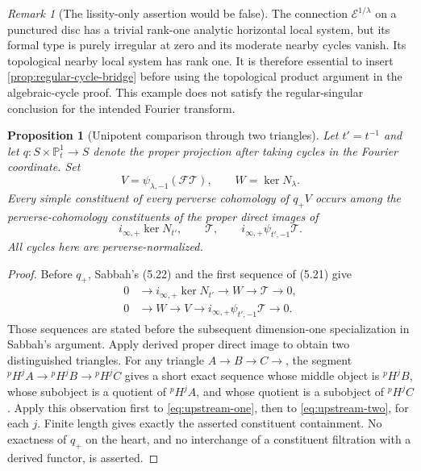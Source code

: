\documentclass[11pt]{article}
\numberwithin{equation}{section}
\newtheorem{proposition}[proposition]{Proposition}
\theoremstyle{definition}
\theoremstyle{remark}
\newtheorem{remark}[remark]{Remark}
\newcommand{\Ecal}{\mathcal E}
\newcommand{\pH}{{}^{p}\!H}
\begin{document}
\begin{remark}[The lissity-only assertion would be false]
The connection $\Ecal^{1/\lambda}$ on a punctured disc has a trivial
rank-one analytic horizontal local system, but its formal type is purely
irregular at zero and its moderate nearby cycles vanish. Its topological
nearby local system has rank one. It is therefore essential to insert
\cref{prop:regular-cycle-bridge} before using the topological product
argument in the algebraic-cycle proof. This example does not satisfy the
regular-singular conclusion for the intended Fourier transform.
\end{remark}

\begin{proposition}[Unipotent comparison through two triangles]\label{prop:two-triangles}
Let $t'=t^{-1}$ and let $q:S\times\mathbb P^1_t\to S$ denote the
proper projection after taking cycles in the Fourier coordinate. Set
\[
 V=\psi_{\lambda,-1}(\mathcal F\mathcal T),\qquad W=\ker N_\lambda.
\]
Every simple constituent of every perverse cohomology of $q_+V$ occurs
among the perverse-cohomology constituents of the proper direct images of
\begin{equation}\label{eq:unipotent-geometric-sources}
 i_{\infty,+}\ker N_{t'},\qquad
 \mathcal T,\qquad
 i_{\infty,+}\psi_{t',-1}\mathcal T.
\end{equation}
All cycles here are perverse-normalized.
\end{proposition}
\begin{proof}
Before $q_+$, Sabbah's (5.22) and the first sequence of (5.21) give
\begin{align}
0&\longrightarrow i_{\infty,+}\ker N_{t'}
 \longrightarrow W\longrightarrow\mathcal T\longrightarrow0,
 \label{eq:upstream-one}\\
0&\longrightarrow W\longrightarrow V
 \longrightarrow i_{\infty,+}\psi_{t',-1}\mathcal T\longrightarrow0.
 \label{eq:upstream-two}
\end{align}\label{eq:sabbah-comparison}
Those sequences are stated before the subsequent dimension-one
specialization in Sabbah's argument. Apply derived proper direct image to
obtain two distinguished triangles. For any triangle $A\to B\to C\to$,
the segment
$\pH^jA\to\pH^jB\to\pH^jC$ gives a short exact sequence whose middle
object is $\pH^jB$, whose subobject is a quotient of $\pH^jA$, and whose
quotient is a subobject of $\pH^jC$. Apply this observation
first to \eqref{eq:upstream-one}, then to \eqref{eq:upstream-two}, for
each $j$. Finite length gives exactly the asserted constituent containment.
No exactness of $q_+$ on the heart, and no interchange of a constituent
filtration with a derived functor, is asserted.
\end{proof}
\end{document}
